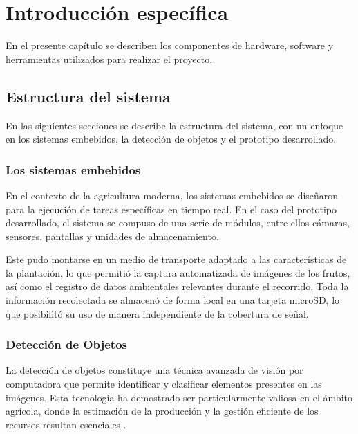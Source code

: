 \chapter{Introducción específica} %

\label{Chapter2}

En el presente capítulo se describen los componentes de hardware, software y herramientas utilizados para realizar el proyecto.

\section{Estructura del sistema}

En las siguientes secciones se describe la estructura del sistema, con un enfoque en los sistemas embebidos, la detección de objetos y el prototipo desarrollado.

\subsection{Los sistemas embebidos}

En el contexto de la agricultura moderna, los sistemas embebidos se diseñaron para la ejecución de tareas específicas en tiempo real. En el caso del prototipo desarrollado, el sistema se compuso de una serie de módulos, entre ellos cámaras, sensores, pantallas y unidades de almacenamiento. 

Este pudo montarse en un medio de transporte adaptado a las características de la plantación, lo que permitió la captura automatizada de imágenes de los frutos, así como el registro de datos ambientales relevantes durante el recorrido. Toda la información recolectada se almacenó de forma local en una tarjeta microSD, lo que posibilitó su uso de manera independiente de la cobertura de señal.

\subsection{Detección de Objetos}

La detección de objetos constituye una técnica avanzada de visión por computadora que permite identificar y clasificar elementos presentes en las imágenes. Esta tecnología ha demostrado ser particularmente valiosa en el ámbito agrícola, donde la estimación de la producción y la gestión eficiente de los recursos resultan esenciales \citep{Lim2020}.

